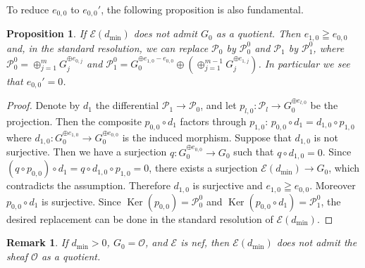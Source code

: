 \documentclass[a4paper,12pt]{amsart}
\newtheorem{prop}[thm]{Proposition}%
\newtheorem{rmk}[thm]{Remark}%
\DeclareMathOperator{\Ker}{Ker}
\begin{document}
To reduce $e_{0,0}$ to $e_{0,0}'$, the following proposition is also fundamental.
\begin{prop}\label{secondconstraint}
If $\mathcal{E}(d_{\min})$ does not admit 
$G_0$
as a quotient.
Then $e_{1,0}\geqq e_{0,0}$ and,
in the 
standard 
resolution, we can replace $\mathcal{P}_0$
by $\mathcal{P}_0^0$ 
and 
$\mathcal{P}_1$ by $\mathcal{P}_1^0$,
where 
$\mathcal{P}_0^0=\oplus_{j=1}^{m}G_{j}^{\oplus e_{0,j}}$
and $\mathcal{P}_1^0=G_0^{\oplus e_{1,0}-e_{0,0}}
\oplus(\oplus_{j=1}^{m-1}G_{j}^{\oplus e_{1,j}})$.
In particular we see that $e_{0,0}'=0$.
\end{prop}
\begin{proof}
Denote by $d_1$ the differential $\mathcal{P}_1\to \mathcal{P}_0$,
and let $p_{l,0}:\mathcal{P}_l\to G_0^{\oplus e_{l,0}}$ be the projection.
Then the composite $p_{0,0}\circ d_1$ factors through $p_{1,0}$:
$p_{0,0}\circ d_1=d_{1,0}\circ p_{1,0}$ 
where $d_{1,0}:G_0^{\oplus e_{1,0}}\to G_0^{\oplus e_{0,0}}$
is the induced morphism.
Suppose that $d_{1,0}$ is not surjective.
Then 
we have a surjection
$q:G_0^{\oplus e_{0,0}}\to G_0$ such that $q\circ d_{1,0}=0$.
Since $(q\circ p_{0,0})\circ d_1=q\circ d_{1,0}\circ p_{1,0}=0$,
there exists a surjection $\mathcal{E}(d_{\min})\to G_0$,
which contradicts the assumption.
Therefore $d_{1,0}$ is surjective and $e_{1,0}\geqq e_{0,0}$.
Moreover
$p_{0,0}\circ d_1
$ is surjective.
Since 
$\Ker(p_{0,0})=
\mathcal{P}_0^0
$ and 
$\Ker(p_{0,0}\circ d_1)
=\mathcal{P}_1^0$,
the desired replacement can be done in the 
standard
resolution of $\mathcal{E}(d_{\min})$.
\end{proof}
\begin{rmk}
If $d_{\min}>0$, $G_0=\mathcal{O}$, and $\mathcal{E}$ is nef,
then $\mathcal{E}(d_{\min})$ does not admit the sheaf $\mathcal{O}$
as a quotient.
\end{rmk}
\end{document}
